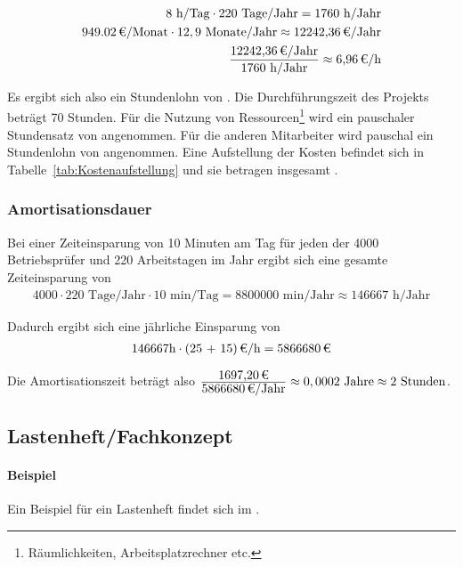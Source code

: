 \begin{eqnarray}
8 \mbox{ h/Tag} \cdot 220 \mbox{ Tage/Jahr} = 1760 \mbox{ h/Jahr}\\
\eur{949.02}\mbox{/Monat} \cdot 12,9 \mbox{ Monate/Jahr} \approx \eur{12242,36} \mbox{/Jahr}\\
\frac{\eur{12242,36} \mbox{/Jahr}}{1760 \mbox{ h/Jahr}} \approx \eur{6,96}\mbox{/h}
\end{eqnarray}

Es ergibt sich also ein Stundenlohn von . 
Die Durchführungszeit des Projekts beträgt 70 Stunden. Für die Nutzung von Ressourcen\footnote{Räumlichkeiten, Arbeitsplatzrechner etc.} wird 
ein pauschaler Stundensatz von  angenommen. Für die anderen Mitarbeiter wird pauschal ein Stundenlohn von  angenommen. 
Eine Aufstellung der Kosten befindet sich in Tabelle~\ref{tab:Kostenaufstellung} und sie betragen insgesamt .


\subsubsection{Amortisationsdauer}
\label{sec:Amortisationsdauer}

Bei einer Zeiteinsparung von 10 Minuten am Tag für jeden der 4000 Betriebsprüfer und 220 Arbeitstagen im Jahr ergibt sich eine gesamte Zeiteinsparung von 
\begin{eqnarray}
4000 \cdot 220 \mbox{ Tage/Jahr} \cdot 10 \mbox{ min/Tag} = 8800000 \mbox{ min/Jahr} \approx 146667 \mbox{ h/Jahr} 
\end{eqnarray}

Dadurch ergibt sich eine jährliche Einsparung von 
\begin{eqnarray}
146667 \mbox{h} \cdot \eur{(25 + 15)}{\mbox{/h}} = \eur{5866680}
\end{eqnarray}

Die Amortisationszeit beträgt also $\frac{\eur{1697,20}}{\eur{5866680}\mbox{/Jahr}} \approx 0,0002 \mbox{ Jahre} \approx 2 \mbox{ Stunden}$.




\subsection{Lastenheft/Fachkonzept}
\label{sec:Lastenheft}

\paragraph{Beispiel}
Ein Beispiel für ein Lastenheft findet sich im . 

